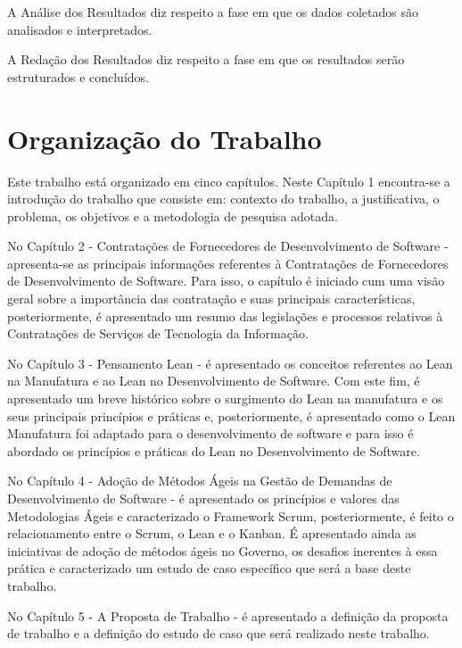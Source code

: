 A Análise dos Resultados diz respeito a fase em que os dados coletados são analisados e interpretados.

A Redação dos Resultados diz respeito a fase em que os resultados serão estruturados e concluídos.

\section[Organização do Trabalho]{Organização do Trabalho}

Este trabalho está organizado em cinco capítulos. Neste Capítulo 1 encontra-se a introdução do trabalho que consiste em: contexto do trabalho, a justificativa,  o problema, os objetivos e a metodologia de pesquisa adotada.

No Capítulo 2 - Contratações de Fornecedores de Desenvolvimento de Software - apresenta-se as principais informações referentes à Contratações de Fornecedores de Desenvolvimento de Software. Para isso, o capítulo é iniciado cum uma visão geral sobre a importância das contratação e suas principais características, posteriormente, é apresentado um resumo das legislações e processos relativos à Contratações de Serviços de Tecnologia da Informação.

No Capítulo 3 - Pensamento Lean - é apresentado os conceitos referentes ao Lean na Manufatura e ao Lean no Desenvolvimento de Software. Com este fim, é apresentado um breve histórico sobre o surgimento do Lean na manufatura e os seus principais princípios e práticas e, posteriormente, é apresentado como o Lean Manufatura foi adaptado para o desenvolvimento de software e para isso é abordado os princípios e práticas do Lean no Desenvolvimento de Software.

No Capítulo 4  - Adoção de Métodos Ágeis na Gestão de Demandas de Desenvolvimento de Software - é apresentado os princípios e valores das Metodologias Ágeis e caracterizado o Framework Scrum, posteriormente, é feito o relacionamento entre o Scrum, o Lean e o Kanban. É apresentado ainda as iniciativas de adoção de métodos ágeis no Governo, os desafios inerentes à essa prática e caracterizado um estudo de caso específico que será a base deste trabalho.

No Capítulo 5 - A Proposta de Trabalho - é apresentado a definição da proposta de trabalho e a definição do estudo de caso que será realizado neste trabalho.